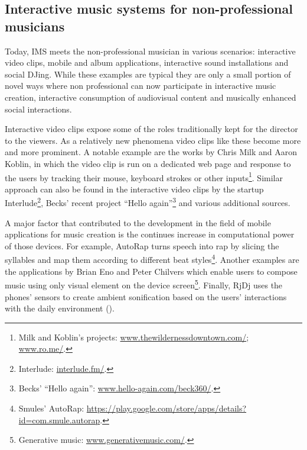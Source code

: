 \documentclass[a4paper,11pt]{article}
\begin{document}
\subsection{Interactive music systems for non-professional musicians}

Today, IMS meets the non-professional musician in various scenarios: interactive video clips, mobile and album applications, interactive sound installations and social DJing.
While these examples are typical they are only a small portion of novel ways where non professional can now participate in interactive music creation, interactive consumption of audiovisual content and musically enhanced social interactions.

Interactive video clips expose some of the roles traditionally kept for the director to the viewers.
As a relatively new phenomena video clips like these become more and more prominent.
A notable example are the works by Chris Milk and Aaron Koblin, in which the video clip is run on a dedicated web page and response to the users by tracking their mouse, keyboard strokes or other inputs\footnote{Milk and Koblin's projects: \href{http://www.thewildernessdowntown.com/}{www.thewildernessdowntown.com/}; \href{http://www.ro.me/}{www.ro.me/}.}.
Similar approach can also be found in the interactive video clips by the startup Interlude\footnote{Interlude: \href{http://interlude.fm/}{interlude.fm/}.}, Becks' recent project ``Hello again''\footnote{Becks' ``Hello again'': \href{http://www.hello-again.com/beck360/}{www.hello-again.com/beck360/}.} and various additional sources.

A major factor that contributed to the development in the field of mobile applications for music creation is the continues increase in computational power of those devices.
For example, AutoRap turns speech into rap by slicing the syllables and map them according to different beat styles\footnote{Smules' AutoRap: \href{https://play.google.com/store/apps/details?id=com.smule.autorap}{https://play.google.com/store/apps/details?id=com.smule.autorap}.}.
Another examples are the applications by Brian Eno and Peter Chilvers which enable users to compose music using only visual element on the device screen\footnote{Generative music: \href{http://www.generativemusic.com/}{www.generativemusic.com/}.}.
Finally, RjDj uses the phones' sensors to create ambient sonification based on the users' interactions with the daily environment (\cite{web:rjdj})\label{rjdj}.
\end{document}

